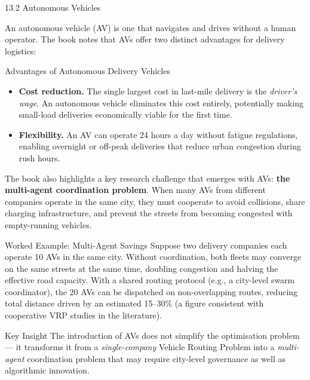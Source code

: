 \documentclass[aspectratio=169,10pt]{beamer}
\begin{document}
\begin{frame}[allowframebreaks]{13.2 Autonomous Vehicles}

  An autonomous vehicle (AV) is one that navigates and drives
  without a human operator.  The book notes that AVs offer
  two distinct advantages for delivery logistics:

  \bigskip
  \begin{block}{Advantages of Autonomous Delivery Vehicles}
    \begin{itemize}
      \item \textbf{Cost reduction.}
            The single largest cost in last-mile delivery is the
            \emph{driver's wage}.  An autonomous vehicle eliminates
            this cost entirely, potentially making small-load
            deliveries economically viable for the first time.

      \item \textbf{Flexibility.}
            An AV can operate 24 hours a day without fatigue
            regulations, enabling overnight or off-peak deliveries
            that reduce urban congestion during rush hours.
    \end{itemize}
  \end{block}

  \bigskip
  The book also highlights a key research challenge that emerges
  with AVs: \textbf{the multi-agent coordination problem}.  When
  many AVs from different companies operate in the same city,
  they must cooperate to avoid collisions, share charging
  infrastructure, and prevent the streets from becoming congested
  with empty-running vehicles.

  \bigskip
  \begin{exampleblock}{Worked Example: Multi-Agent Savings}
    Suppose two delivery companies each operate 10 AVs in the same
    city.  Without coordination, both fleets may converge on the
    same streets at the same time, doubling congestion and halving
    the effective road capacity.  With a shared routing protocol
    (e.g., a city-level swarm coordinator), the 20 AVs can be
    dispatched on non-overlapping routes, reducing total distance
    driven by an estimated 15--30\% (a figure consistent with
    cooperative VRP studies in the literature).
  \end{exampleblock}

  \bigskip
  \begin{alertblock}{Key Insight}
    The introduction of AVs does not simplify the optimisation
    problem --- it transforms it from a \emph{single-company}
    Vehicle Routing Problem into a \emph{multi-agent} coordination
    problem that may require city-level governance as well as
    algorithmic innovation.
  \end{alertblock}

\end{frame}
\end{document}
